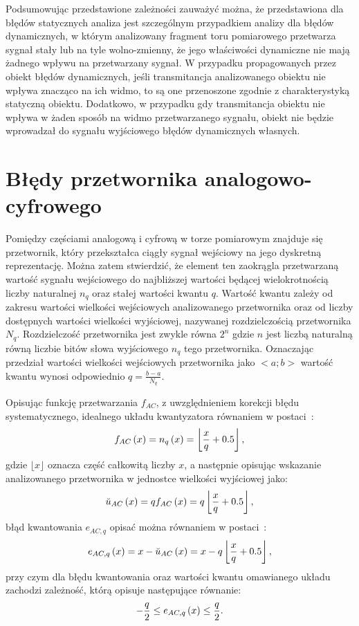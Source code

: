 Podsumowując przedstawione zależności zauważyć można, że przedstawiona dla błędów statycznych analiza jest szczególnym przypadkiem analizy dla błędów dynamicznych, w którym analizowany fragment toru pomiarowego przetwarza sygnał stały lub na tyle wolno-zmienny, że jego właściwości dynamiczne nie mają żadnego wpływu na przetwarzany sygnał. W przypadku propagowanych przez obiekt błędów dynamicznych, jeśli transmitancja analizowanego obiektu nie wpływa znacząco na ich widmo, to są one przenoszone zgodnie z charakterystyką statyczną obiektu. Dodatkowo, w przypadku gdy transmitancja obiektu nie wpływa w żaden sposób na widmo przetwarzanego sygnału, obiekt nie będzie wprowadzał do sygnału wyjściowego błędów dynamicznych własnych.

\section{Błędy przetwornika analogowo-cyfrowego}

Pomiędzy częściami analogową i cyfrową w torze pomiarowym znajduje się przetwornik, który przekształca ciągły sygnał wejściowy na jego dyskretną reprezentację. Można zatem stwierdzić, że element ten zaokrągla przetwarzaną wartość sygnału wejściowego do najbliższej wartości będącej wielokrotnością liczby naturalnej $n_{q}$ oraz stałej wartości kwantu $q$. Wartość kwantu zależy od zakresu wartości wielkości wejściowych analizowanego przetwornika oraz od liczby dostępnych wartości wielkości wyjściowej, nazywanej rozdzielczością przetwornika $N_{q}$. Rozdzielczość przetwornika jest zwykle równa $2^{n}$ gdzie $n$ jest liczbą naturalną równą liczbie bitów słowa wyjściowego $n_{q}$ tego przetwornika. Oznaczając przedział wartości wielkości wejściowych przetwornika jako $<a;b>$ wartość kwantu wynosi odpowiednio $q = \frac{b - a}{N_{q}}$.

Opisując funkcję przetwarzania $f_{AC}$, z uwzględnieniem korekcji błędu systematycznego, idealnego układu kwantyzatora równaniem w postaci~\cite{jakubiec_system}:
\begin{equation}
f_{AC} \left(x\right) = n_{q} \left(x\right) = \left\lfloor \frac{x}{q} + 0.5 \right\rfloor \label{eq:adc_function},
\end{equation}
gdzie $\lfloor x \rfloor$ oznacza część całkowitą liczby $x$, a następnie opisując wskazanie analizowanego przetwornika w jednostce wielkości wyjściowej jako:
\begin{equation}
\breve{u}_{AC} \left(x\right) = q f_{AC} \left(x\right) = q \left\lfloor \frac{x}{q} + 0.5 \right\rfloor \label{eq:adc_output},
\end{equation}
błąd kwantowania $e_{AC,q}$ opisać można równaniem w postaci~\cite{jakubiec_system}:
\begin{equation}
e_{AC,q} \left(x\right) = x - \breve{u}_{AC} \left(x\right) = x - q \left\lfloor \frac{x}{q} + 0.5 \right\rfloor \label{eq:adc_qerror},
\end{equation}
przy czym dla błędu kwantowania oraz wartości kwantu omawianego układu zachodzi zależność, którą opisuje następujące równanie:
\begin{equation}
-\frac{q}{2} \le e_{AC,q} \left(x\right) \le \frac{q}{2} \label{eq:adc_qerrrange}.
\end{equation}

